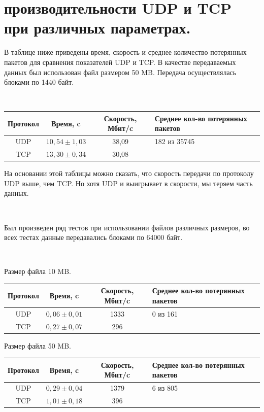 \documentclass{article}
\begin{document}
\section{\textbf{ производительности UDP и TCP при различных параметрах.}}

В таблице ниже приведены время, скорость и среднее количество потерянных пакетов для сравнения показателей UDP и TCP. В качестве передаваемых данных был использован файл размером 50 MB. Передача осуществлялась блоками по 1440 байт.

~\

\begin{table}[h]
\begin{tabular}{|c|c|c|p{130pt}|}
\hline
Протокол & Время, c & Скорость, Мбит/c & Среднее кол-во потерянных пакетов \\
\hline
UDP & $10,54 \pm 1,03$ & 38,09 & 182 из 35745\\
TCP & $13,30 \pm 0,34$ & 30,08 &  \\
\hline
\end{tabular}
\end{table}

На основании этой таблицы можно сказать, что скорость передачи по протоколу UDP выше, чем TCP. Но хотя UDP и выигрывает в скорости, мы теряем часть данных.

~\

Был произведен ряд тестов при использовании файлов различных размеров, во всех тестах данные передавались блоками по 64000 байт.

~\

Размер файла 10 MB.

\begin{table}[h!]
\begin{tabular}{|c|c|c|p{130pt}|}
\hline
Протокол & Время, c & Скорость, Мбит/c & Среднее кол-во потерянных пакетов \\
\hline
UDP & $0,06 \pm 0,01$ & 1333 & 0 из 161\\
TCP & $0,27 \pm 0,07$ & 296 &  \\
\hline
\end{tabular}
\end{table}

\newpage

Размер файла 50 MB.

\begin{table}[h!]
\begin{tabular}{|c|c|c|p{130pt}|}
\hline
Протокол & Время, c & Скорость, Мбит/c & Среднее кол-во потерянных пакетов \\
\hline
UDP & $0,29 \pm 0,04$ & 1379 & 6 из 805\\
TCP & $1,01 \pm 0,18$ & 396 &  \\
\hline
\end{tabular}
\end{table}
\end{document}
